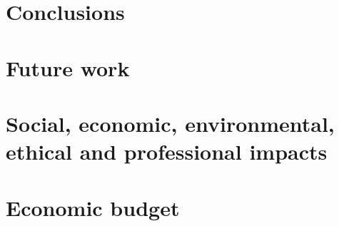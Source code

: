\documentclass{etsit-report}
\begin{document}
\chapter{Conclusions}
\label{chap:conclusions}


\chapter{Future work}
\label{chap:future}


\printbibliography

\appendix

\chapter{Social, economic, environmental, ethical and professional impacts}
\label{app:impacts}


\chapter{Economic budget}
\label{app:budget}
\end{document}
